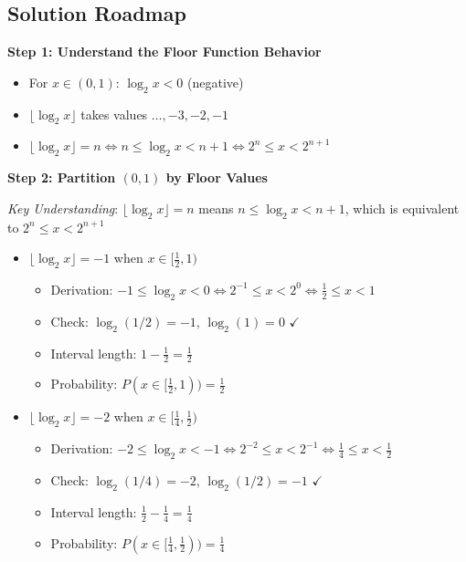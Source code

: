 \documentclass[11pt]{article}
\begin{document}
\begin{solutionbox}
\subsection*{Solution Roadmap}

\textbf{Step 1: Understand the Floor Function Behavior}
\begin{itemize}
    \item For $x \in (0,1)$: $\log_2 x < 0$ (negative)
    \item $\lfloor\log_2 x\rfloor$ takes values $\ldots, -3, -2, -1$
    \item $\lfloor\log_2 x\rfloor = n \iff n \leq \log_2 x < n+1 \iff 2^n \leq x < 2^{n+1}$
\end{itemize}

\textbf{Step 2: Partition $(0,1)$ by Floor Values}

\textit{Key Understanding}: $\lfloor\log_2 x\rfloor = n$ means $n \leq \log_2 x < n+1$, which is equivalent to $2^n \leq x < 2^{n+1}$

\begin{itemize}
    \item $\lfloor\log_2 x\rfloor = -1$ when $x \in [\frac{1}{2}, 1)$ 
    \begin{itemize}
        \item Derivation: $-1 \leq \log_2 x < 0 \iff 2^{-1} \leq x < 2^0 \iff \frac{1}{2} \leq x < 1$
        \item Check: $\log_2(1/2) = -1$, $\log_2(1) = 0$ $\checkmark$
        \item Interval length: $1 - \frac{1}{2} = \frac{1}{2}$
        \item Probability: $P(x \in [\frac{1}{2}, 1)) = \frac{1}{2}$
    \end{itemize}
    
    \item $\lfloor\log_2 x\rfloor = -2$ when $x \in [\frac{1}{4}, \frac{1}{2})$
    \begin{itemize}
        \item Derivation: $-2 \leq \log_2 x < -1 \iff 2^{-2} \leq x < 2^{-1} \iff \frac{1}{4} \leq x < \frac{1}{2}$
        \item Check: $\log_2(1/4) = -2$, $\log_2(1/2) = -1$ $\checkmark$
        \item Interval length: $\frac{1}{2} - \frac{1}{4} = \frac{1}{4}$
        \item Probability: $P(x \in [\frac{1}{4}, \frac{1}{2})) = \frac{1}{4}$
    \end{itemize}
    

\end{itemize}
\end{solutionbox}
\end{document}
